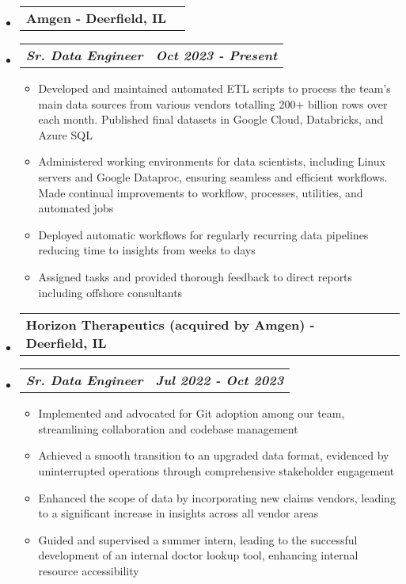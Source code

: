 \documentclass[letterpaper,11pt]{article}
\makeatletter
\newcommand{\resumeItem}[1]{
  \item\small{
    {#1 \vspace{0pt}}
  }
}
\newcommand{\resumeSubheading}[2]{
  \vspace{-1pt}\item
    \begin{tabular*}{0.97\textwidth}[t]{l@{\extracolsep{\fill}}r}
      \textbf{\small#1 - \small#2} 
    \end{tabular*}\vspace{-13pt}
}
\newcommand{\resumeSubSubheading}[2]{
    \item
    \vspace{2pt}
    \begin{tabular*}{0.97\textwidth}{l@{\extracolsep{\fill}}r}
      \textbf{\textit{\small#1}} & \textbf{\textit{\small#2}} \\
    \end{tabular*}\vspace{-5pt}
}
\newcommand{\resumeHeadingListStart}{\begin{itemize}[leftmargin=0.05in, label={}]}
\newcommand{\resumeHeadingListEnd}{\end{itemize}}
\newcommand{\resumeSubHeadingListStart}{\begin{itemize}[leftmargin=0.15in, label={}]}
\newcommand{\resumeSubHeadingListEnd}{\end{itemize}\vspace{-15pt}}
\newcommand{\resumeItemListStart}{\begin{itemize}[leftmargin=0.15in]}
\newcommand{\resumeItemListEnd}{\end{itemize}\vspace{-10pt}}
\makeatother
\begin{document}
    \resumeHeadingListStart
        \resumeSubheading{Amgen}{Deerfield, IL}
    \resumeHeadingListEnd
        \resumeSubHeadingListStart
            \resumeSubSubheading {Sr. Data Engineer}{Oct 2023 - Present}
            \resumeItemListStart
                \resumeItem{Developed and maintained automated ETL scripts to process the team's
                            main data sources from various vendors totalling 200+ billion rows over each month. Published 
                            final datasets in Google Cloud, Databricks, and Azure SQL}
                \resumeItem{Administered working environments for data scientists, including Linux servers 
                            and Google Dataproc, ensuring seamless and efficient 
                            workflows. Made continual improvements to workflow, processes, utilities, and automated 
                            jobs}
                \resumeItem{Deployed automatic workflows for regularly recurring data pipelines reducing time to insights from weeks to days}
                \resumeItem{Assigned tasks and provided thorough feedback to direct reports including offshore consultants }
            \resumeItemListEnd
        \resumeSubHeadingListEnd
    \resumeHeadingListStart
        \resumeSubheading{Horizon Therapeutics (acquired by Amgen)}{Deerfield, IL}
    \resumeHeadingListEnd
        \resumeSubHeadingListStart
            \resumeSubSubheading {Sr. Data Engineer}{Jul 2022 - Oct 2023}
            \resumeItemListStart
                \resumeItem{Implemented and advocated for Git adoption among our team, streamlining 
                            collaboration and codebase management}
                \resumeItem{Achieved a smooth transition to an upgraded data format, evidenced by uninterrupted operations through comprehensive stakeholder engagement}
                \resumeItem{Enhanced the scope of data by incorporating new claims vendors, leading to a significant increase in insights across all vendor areas}
                \resumeItem{Guided and supervised a summer intern, leading to the successful development of an internal doctor lookup tool, enhancing internal resource accessibility}
            \resumeItemListEnd
        \resumeSubHeadingListEnd
\end{document}
